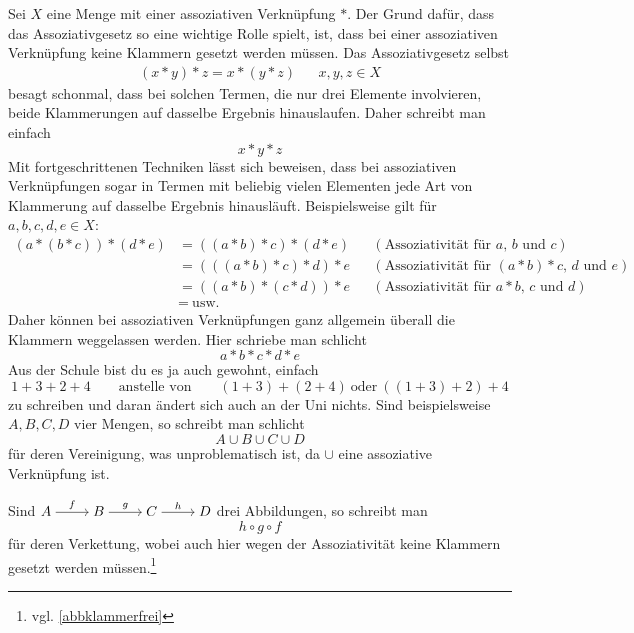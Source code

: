\begin{bem} \label{klammerfrei}
    Sei $X$ eine Menge mit einer assoziativen Verknüpfung $*$. Der Grund dafür, dass das Assoziativgesetz so eine wichtige Rolle spielt, ist, dass bei einer assoziativen Verknüpfung keine Klammern gesetzt werden müssen. Das Assoziativgesetz selbst
    \begin{align*}
        (x*y)*z = x*(y*z) && x,y,z\in X
    \end{align*}
    besagt schonmal, dass bei solchen Termen, die nur drei Elemente involvieren, beide Klammerungen auf dasselbe Ergebnis hinauslaufen. Daher schreibt man einfach
        \[ x*y*z \]
    Mit fortgeschrittenen Techniken lässt sich beweisen, dass bei assoziativen Verknüpfungen sogar in Termen mit beliebig vielen Elementen jede Art von Klammerung auf dasselbe Ergebnis hinausläuft. Beispielsweise gilt für $a,b,c,d,e\in X$:
    \begin{align*}
        (a*(b*c))*(d*e) & =((a*b)*c)*(d*e) && (\text{Assoziativität für $a$, $b$ und $c$})\\
        & = (((a*b)*c)*d)*e && (\text{Assoziativität für $(a*b)*c$, $d$ und $e$})  \\
        & = ((a*b)*(c*d))*e && (\text{Assoziativität für $a*b$, $c$ und $d$})\\
        &=\ \text{usw.}
    \end{align*}
    Daher können bei assoziativen Verknüpfungen ganz allgemein überall die Klammern weggelassen werden. Hier schriebe man schlicht
        \[ a*b*c*d*e \]
    Aus der Schule bist du es ja auch gewohnt, einfach
        \[ 1+3+2+4 \qquad\text{anstelle von}\qquad (1+3)+(2+4)\ \text{oder}\ ((1+3)+2)+4 \]
    zu schreiben und daran ändert sich auch an der Uni nichts. Sind beispielsweise $A,B,C,D$ vier Mengen, so schreibt man schlicht
        \[ A\cup B\cup C \cup D \]
    für deren Vereinigung, was unproblematisch ist, da $\cup$ eine assoziative Verknüpfung ist.

    Sind $\begin{tikzcd}[cramped] A\ar[r, "f"] & B\ar[r, "g"] & C \ar[r, "h"] & D \end{tikzcd}$ drei Abbildungen, so schreibt man
        \[ h\circ g\circ f \]
    für deren Verkettung, wobei auch hier wegen der Assoziativität keine Klammern gesetzt werden müssen.\footnote{vgl. \cref{abbklammerfrei}}
\end{bem}


